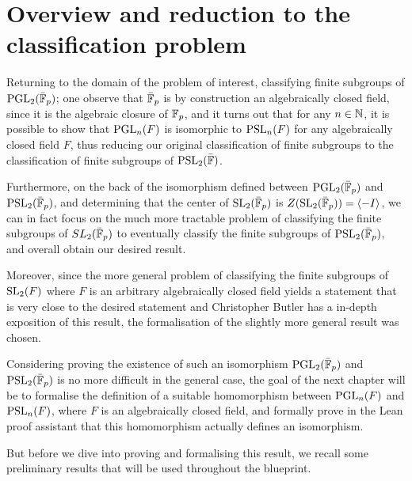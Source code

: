 





\section{Overview and reduction to the classification problem}

Returning to the domain of the problem of interest, classifying finite subgroups of $\operatorname{PGL}_2(\bar{\mathbb{F}}_p)$; one observe that $\bar{\mathbb{F}}_p$ is by construction an algebraically closed field, since it is the algebraic closure of $\mathbb{F}_p$,
and it turns out that for any $n \in \mathbb{N}$, it is possible to show that $\operatorname{PGL}_n(F)$ is isomorphic to $\operatorname{PSL}_n(F)$ for any algebraically closed field $F$, thus reducing our original classification of finite subgroups to the classification of finite subgroups of $\operatorname{PSL}_2(\bar{\mathbb{F}})$.

Furthermore, on the back of the isomorphism defined between $\operatorname{PGL}_2(\bar{\mathbb{F}}_p)$ and $\operatorname{PSL}_2(\bar{\mathbb{F}}_p)$, and determining that the center of $\operatorname{SL}_2(\bar{\mathbb{F}}_p)$ is $Z(\operatorname{SL}_2(\bar{\mathbb{F}}_p)) = \langle -I\rangle$, we can in fact focus on the much more tractable problem of 
classifying the finite subgroups of $SL_2(\bar{\mathbb{F}}_p)$ to eventually classify the finite subgroups of $\operatorname{PSL}_2(\bar{\mathbb{F}}_p)$, and overall obtain our desired result. 

Moreover, since the more general problem of classifying the finite subgroups of $\operatorname{SL}_2(F)$ where $F$ is an arbitrary algebraically closed field
yields a statement that is very close to the desired statement and Christopher Butler has a in-depth exposition of this result, the formalisation of the slightly more general result was chosen.

Considering proving the existence of such an isomorphism $\operatorname{PGL}_2(\bar{\mathbb{F}}_p)$ and $\operatorname{PSL}_2(\bar{\mathbb{F}}_p)$ is no more difficult in the general case, 
the goal of the next chapter will be to formalise the definition of a suitable homomorphism between $\operatorname{PGL}_n(F)$ and $\operatorname{PSL}_n(F)$, where $F$ is an algebraically closed field, 
and formally prove in the Lean proof assistant that this homomorphism actually defines an isomorphism.

But before we dive into proving and formalising this result, we recall some preliminary results that will be used throughout the blueprint.